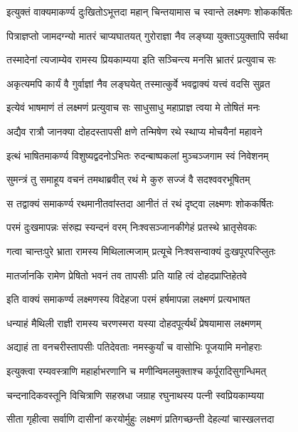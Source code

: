 \twolineshloka
{इत्युक्तं वाक्यमाकर्ण्य दुःखितोऽभूत्तदा महान्}
{चिन्तयामास च स्वान्ते लक्ष्मणः शोककर्षितः}%

\twolineshloka
{पित्राज्ञप्तो जामदग्न्यो मातरं चाप्यघातयत्}
{गुरोराज्ञा नैव लङ्घ्या युक्ताऽयुक्तापि सर्वथा}%

\twolineshloka
{तस्मादेनां त्यजाम्येव रामस्य प्रियकाम्यया}
{इति सञ्चिन्त्य मनसि भ्रातरं प्रत्युवाच सः}%


\twolineshloka
{अकृत्यमपि कार्यं वै गुर्वाज्ञां नैव लङ्घयेत्}
{तस्मात्कुर्वे भवद्वाक्यं यत्त्वं वदसि सुव्रत}%

\twolineshloka
{इत्येवं भाषमाणं तं लक्ष्मणं प्रत्युवाच सः}
{साधुसाधु महाप्राज्ञ त्वया मे तोषितं मनः}%

\twolineshloka
{अद्यैव रात्रौ जानक्या दोहदस्तापसी क्षणे}
{तन्मिषेण रथे स्थाप्य मोचयैनां महावने}%

\twolineshloka
{इत्थं भाषितमाकर्ण्य विशुष्यद्वदनोऽभितः}
{रुदन्बाष्पकलां मुञ्चञ्जगाम स्वं निवेशनम्}%

\twolineshloka
{सुमन्त्रं तु समाहूय वचनं तमथाब्रवीत्}
{रथं मे कुरु सज्जं वै सदश्ववरभूषितम्}%

\twolineshloka
{स तद्वाक्यं समाकर्ण्य रथमानीतवांस्तदा}
{आनीतं तं रथं दृष्ट्वा लक्ष्मणः शोककर्षितः}%

\twolineshloka
{परमं दुःखमापन्नः संरुह्य स्यन्दनं वरम्}
{निःश्वसञ्जानकीगेहं प्रतस्थे भ्रातृसेवकः}%

\twolineshloka
{गत्वा चान्तःपुरे भ्राता रामस्य मिथिलात्मजाम्}
{प्रत्यूचे निःश्वसन्वाक्यं दुःखपूरपरिप्लुतः}%

\twolineshloka
{मातर्जानकि रामेण प्रेषितो भवनं तव}
{तापसीः प्रति याहि त्वं दोहदप्राप्तिहेतवे}%

\twolineshloka
{इति वाक्यं समाकर्ण्य लक्ष्मणस्य विदेहजा}
{परमं हर्षमापन्ना लक्ष्मणं प्रत्यभाषत}%


\twolineshloka
{धन्याहं मैथिली राज्ञी रामस्य चरणस्मरा}
{यस्या दोहदपूर्त्यर्थं प्रेषयामास लक्ष्मणम्}%

\twolineshloka
{अद्याहं ता वनचरीस्तापसीः पतिदेवताः}
{नमस्कुर्यां च वासोभिः पूजयामि मनोहराः}%

\twolineshloka
{इत्युक्त्वा रम्यवस्त्राणि महार्हाभरणानि च}
{मणीन्विमलमुक्ताश्च कर्पूरादिसुगन्धिमत्}%

\twolineshloka
{चन्दनादिकवस्तूनि विचित्राणि सहस्रधा}
{जग्राह रघुनाथस्य पत्नी स्वप्रियकाम्यया}%

\twolineshloka
{सीता गृहीत्वा सर्वाणि दासीनां करयोर्मुहुः}
{लक्ष्मणं प्रतिगच्छन्ती देहल्यां चास्खलत्तदा}%


